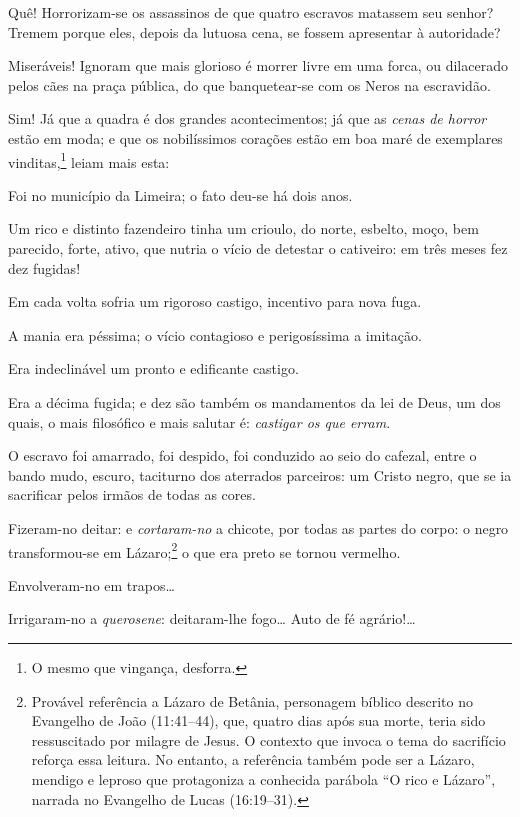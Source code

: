 Quê! Horrorizam-se os assassinos de que quatro escravos matassem seu
senhor? Tremem porque eles, depois da lutuosa cena, se fossem apresentar
à autoridade?

Miseráveis! Ignoram que mais glorioso é morrer livre em uma forca, ou
dilacerado pelos cães na praça pública, do que banquetear-se com os
Neros na escravidão.

Sim! Já que a quadra é dos grandes acontecimentos; já que as \emph{cenas
de horror} estão em moda; e que os nobilíssimos corações estão em boa
maré de exemplares vinditas,\footnote{O mesmo que vingança, desforra.}
leiam mais esta:

Foi no município da Limeira; o fato deu-se há dois anos.

Um rico e distinto fazendeiro tinha um crioulo, do norte, esbelto, moço,
bem parecido, forte, ativo, que nutria o vício de detestar o cativeiro:
em três meses fez dez fugidas!

Em cada volta sofria um rigoroso castigo, incentivo para nova fuga.

A mania era péssima; o vício contagioso e perigosíssima a imitação.

Era indeclinável um pronto e edificante castigo.

Era a décima fugida; e dez são também os mandamentos da lei de Deus, um
dos quais, o mais filosófico e mais salutar é: \emph{castigar os que
erram.}

O escravo foi amarrado, foi despido, foi conduzido ao seio do cafezal,
entre o bando mudo, escuro, taciturno dos aterrados parceiros: um Cristo negro, que se ia sacrificar pelos irmãos de todas as cores.

Fizeram-no deitar: e \emph{cortaram-no} a chicote, por todas as partes
do corpo: o negro transformou-se em Lázaro;\footnote{Provável
  referência a Lázaro de Betânia, personagem bíblico descrito no
  Evangelho de João (11:41--44), que, quatro dias após sua morte, teria
  sido ressuscitado por milagre de Jesus. O contexto que invoca o tema
  do sacrifício reforça essa leitura. No entanto, a
  referência também pode ser a Lázaro, mendigo e leproso que protagoniza
  a conhecida parábola ``O rico e Lázaro'', narrada no Evangelho de
  Lucas (16:19--31).} o que era preto se tornou vermelho.

Envolveram-no em trapos\ldots{}

Irrigaram-no a \emph{querosene}: deitaram-lhe fogo\ldots{} Auto de fé
agrário!\ldots{}

